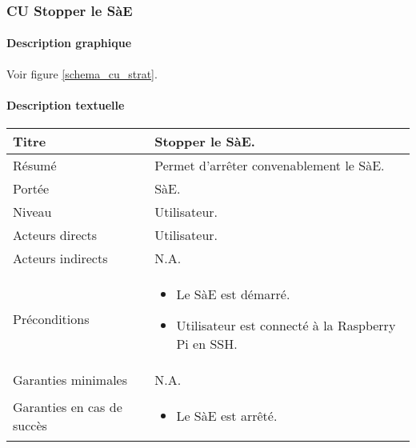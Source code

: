 \newpage
\subsubsection{CU Stopper le SàE}
\paragraph{Description graphique}
Voir figure \ref{schema_cu_strat}.
\paragraph{Description textuelle}
\medskip

\begin{longtable}[l]{|p{3cm}|p{11.7cm}|}
    \hline
    
        Titre & Stopper le SàE. \\
    \hline

        Résumé & Permet d'arrêter convenablement le SàE. \\
    \hline

        Portée & SàE.\\
    \hline

        Niveau & Utilisateur.\\
    \hline

        Acteurs directs & Utilisateur.\\
    \hline 

        Acteurs indirects & N.A. \\
    \hline

        Préconditions & 
        \begin{itemize}
            \item Le SàE est démarré. 
            \item Utilisateur est connecté à la Raspberry Pi en SSH.
        \end{itemize}
        \\
    \hline

        Garanties \newline minimales & N.A. \\
    \hline

        Garanties en cas de succès & 
        \begin{itemize}
            \item Le SàE est arrêté. 
        \end{itemize}
        \\
    \hline


\end{longtable}

